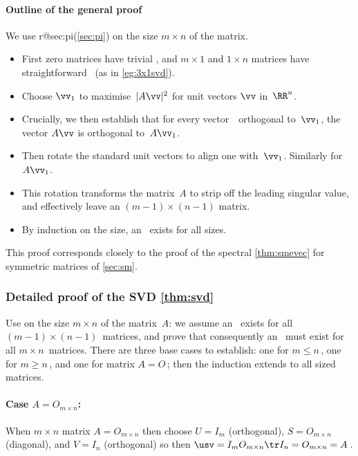 




\paragraph{Outline of the general proof} 
We use  
\ifcsname r@sec:pi\endcsname (\autoref{sec:pi}) \fi
on the size \(m\times n\) of the matrix.
\begin{itemize}
\item First zero matrices have trivial \svd, and
\(m\times 1\) and \(1\times n\) matrices have straightforward \svd\ (as in \autoref{eg:3x1svd}).
\item Choose \(\vv_1\) to maximise~\(|A\vv|^2\) for unit vectors \(\vv\) in~\(\RR^n\).
\item Crucially, we then establish that for every vector~\vv\ orthogonal to~\(\vv_1\), the vector \(A\vv\) is orthogonal to~\(A\vv_1\).
\item Then rotate the standard unit vectors to align one with~\(\vv_1\). Similarly for~\(A\vv_1\).  
\item This rotation transforms the matrix~\(A\) to strip off the leading singular value, and effectively leave an \((m-1)\times(n-1)\) matrix.
\item  By induction on the size, an \svd\ exists for all sizes.
\end{itemize}
This proof corresponds closely to the proof of the spectral \autoref{thm:smevec} for symmetric matrices of \autoref{sec:sm}. 





\subsubsection{Detailed proof of the SVD \autoref{thm:svd}}
\label{sec:dpsvdt}

Use  on the size \(m\times n\) of the matrix~\(A\): we assume an \svd\ exists for all \((m-1)\times(n-1)\)~matrices, and prove that consequently an \svd\ must exist for all \(m\times n\)~matrices.  There are three base cases to establish: one for \(m\leq n\)\,, one for \(m\geq n\)\,, and one for matrix \(A=O\)\,; then the induction extends to all sized matrices.

\paragraph{Case $A=O_{m\times n}$:}
When \(m\times n\) matrix \(A=O_{m\times n}\) then choose \(U=I_m\) (orthogonal), \(S=O_{m\times n}\) (diagonal), and \(V=I_n\) (orthogonal) so then \(\usv=I_mO_{m\times n}\tr I_n=O_{m\times n}=A\)\,.  

